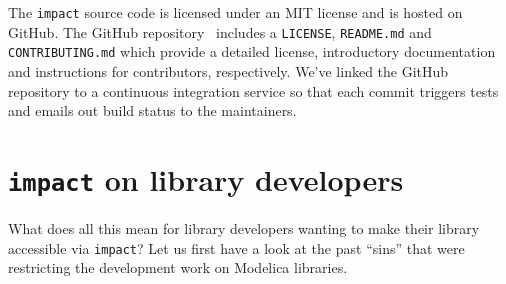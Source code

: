 \documentclass[11pt,a4paper,twocolumn]{article}
\newcommand{\code}[1]{\texttt{#1}} %
\begin{document}
The \code{impact} source code is licensed under an MIT license and is
hosted on GitHub.  The GitHub repository~\parencite{impact-repo}
includes a \code{LICENSE}, \code{README.md} and \code{CONTRIBUTING.md}
which provide a detailed license, introductory documentation and
instructions for contributors, respectively.  We've linked the GitHub
repository to a continuous integration service so that each commit
triggers tests and emails out build status to the maintainers.

\section{\code{impact} on library developers}

What does all this mean for library developers wanting to make their
library accessible via \code{impact}? Let us first have a look at the
past ``sins'' that were restricting the development work on Modelica
libraries.
\end{document}
